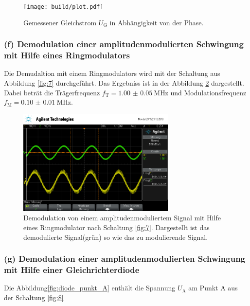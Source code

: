 \begin{figure}
  \centering
  \texttt{[image: build/plot.pdf]}
  \caption{Gemessener Gleichstrom $U_{\text{G}}$ in Abhängigkeit von der Phase.}
  \label{fig:plot}
\end{figure}

\subsubsection{(f) Demodulation einer amplitudenmodulierten Schwingung
mit Hilfe eines Ringmodulators}
\label{subsubsec:auswertung_f}
Die Demudaltion mit einem Ringmodulators wird mit der Schaltung
aus Abbildung \ref{fig:7} durchgeführt. Das Ergebniss ist
in der Abbildung \ref{fig:amp_demod_ring} dargestellt.
Dabei beträt die Trägerfrequenz $f_{\text{T}}=\SI{1.00(5)}{\mega\hertz}$
und Modulationsfrequenz $f_{\text{M}}=\SI{0.10(1)}{\mega\hertz}$.


\begin{figure}
  \centering
  \includegraphics[width=0.7\textwidth]{osci/amp_demod.png}
  \caption{Demodulation von einem amplitudenmoduliertem Signal mit Hilfe eines
  Ringmodulator nach Schaltung \ref{fig:7}. Dargestellt ist das demodulierte Signal(grün) so wie das zu modulierende Signal.}
  \label{fig:amp_demod_ring}
\end{figure}





\subsubsection{(g) Demodulation einer amplitudenmodulierten Schwingung
mit Hilfe einer Gleichrichterdiode}
\label{subsubsec:auswertung_g}
Die Abbildung\ref{fig:diode_punkt_A} enthält die Spannung $U_{\text{A}}$ am Punkt A aus der
Schaltung \ref{fig:8}



